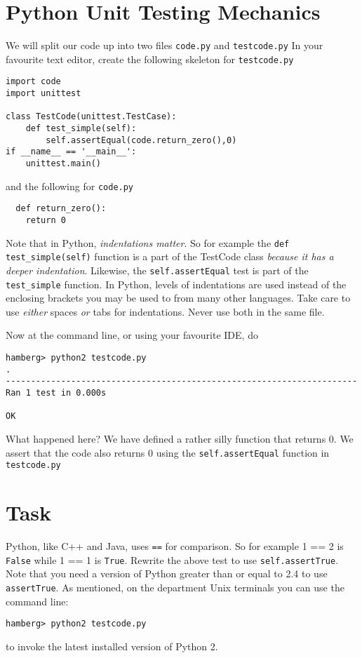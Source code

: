 \documentclass{paper}
\begin{document}
\section*{Python Unit Testing Mechanics}
We will split our code up into two files \texttt{code.py} and \texttt{testcode.py}
In your favourite text editor, create the following skeleton for \texttt{testcode.py}

\begin{lstlisting}
import code
import unittest

class TestCode(unittest.TestCase):
    def test_simple(self):
        self.assertEqual(code.return_zero(),0)
if __name__ == '__main__':
    unittest.main()
\end{lstlisting}

and the following for {\tt code.py}

\begin{lstlisting}
  def return_zero():
    return 0
\end{lstlisting}
Note that in Python, \emph{indentations matter}. So for example the {\tt def test\_simple(self)} function is a part of the TestCode class \emph{because it has a deeper indentation}. Likewise, the {\tt self.assertEqual} test is part of the {\tt test\_simple} function. In Python, levels of indentations are used instead of the enclosing brackets you may be used to from many other languages. Take care to use \emph{either} spaces \emph{or} tabs for indentations. Never use both in the same file.

Now at the command line, or using your favourite IDE, do
\begin{verbatim}
hamberg> python2 testcode.py
.
----------------------------------------------------------------------
Ran 1 test in 0.000s

OK

\end{verbatim}
What happened here? We have defined a rather silly function that
returns 0. We assert that the code also returns 0 using the {\tt self.assertEqual} function in {\tt testcode.py} 
  
\section{Task}
Python, like C++ and Java, uses {\tt ==} for comparison. So for example {1 == 2}
is {\tt False} while {1 == 1} is {\tt True}. Rewrite the above test to use
{\tt self.assertTrue}. Note that you need a version of Python greater than or
equal to 2.4 to use {\tt assertTrue}. As mentioned, on the department Unix
terminals you can use the command line:
\begin{verbatim}
hamberg> python2 testcode.py
\end{verbatim}
to invoke the latest installed version of Python 2.
\end{document}
